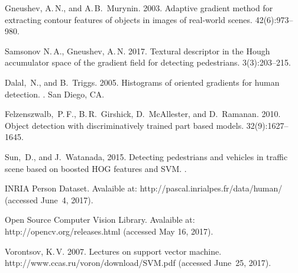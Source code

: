 \documentclass[12pt,twoside]{article}
\begin{document}
\begin{thebibliography}{99}
Gneushev, A.\,N., and A.\,B.~Murynin.	
2003. Adaptive gradient method for extracting contour features of
objects in images of real-world scenes.
 42(6):973--980.

Samsonov N.\,A., Gneushev, A.\,N.	
2017. Textural descriptor in the Hough accumulator space of the gradient field for detecting pedestrians.
 3(3):203--215.


Dalal,~N., and B.~Triggs. 2005.
 Histograms of oriented gradients for
human detection. . San Diego, CA.

	{Felzenszwalb,~P.\,F., B.\,R.~Girshick, D.~McAllester,
	and D.~Ramanan}. 2010.
	Object detection with discriminatively trained part based models.
 32(9):1627--1645.

	{Sun,~D., and J.~Watanada}, 2015.
	Detecting pedestrians and vehicles in traffic scene based on
	boosted HOG features and SVM.
.

	INRIA Person Dataset.
	Avalaible at: {\sf http://pascal.inrialpes.fr/data/human/}
	(accessed June~4, 2017).

	Open Source Computer Vision Library.
	Avalaible at: {\sf http://opencv.org/releases.html}
	(accessed May 16, 2017).
	
	Vorontsov, K.\,V. 2007. Lectures on support vector machine.
	{\sf http://www.ccas.ru/voron/download/\linebreak SVM.pdf}
	(accessed June~25, 2017).

\end{thebibliography}



\end{document}
